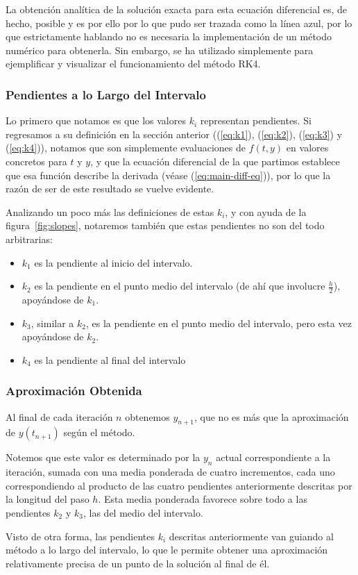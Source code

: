 La obtención analítica de la solución exacta para esta ecuación diferencial es, de hecho, posible y es por ello por lo que pudo ser trazada como la línea azul, por lo que estrictamente hablando no es necesaria la implementación de un método numérico para obtenerla. Sin embargo, se ha utilizado simplemente para ejemplificar y visualizar el funcionamiento del método RK4.

\subsubsection{Pendientes a lo Largo del Intervalo}

Lo primero que notamos es que los valores \(k_{i}\) representan pendientes. Si regresamos a su definición en la sección anterior ((\ref{eq:k1}), (\ref{eq:k2}), (\ref{eq:k3}) y (\ref{eq:k4})), notamos que son simplemente evaluaciones de \(f(t,y)\) en valores concretos para \(t\) y \(y\), y que la ecuación diferencial de la que partimos establece que esa función describe la derivada (véase (\ref{eq:main-diff-eq})), por lo que la razón de ser de este resultado se vuelve evidente.

Analizando un poco más las definiciones de estas \(k_{i}\), y con ayuda de la figura~\ref{fig:slopes}, notaremos también que estas pendientes no son del todo arbitrarias:
\begin{itemize}
	\item \(k_{1}\) es la pendiente al inicio del intervalo.
	\item \(k_{2}\) es la pendiente en el punto medio del intervalo (de ahí que involucre \(\frac{h}{2}\)), apoyándose de \(k_{1}\).
	\item \(k_{3}\), similar a \(k_{2}\), es la pendiente en el punto medio del intervalo, pero esta vez apoyándose de \(k_{2}\).
	\item \(k_{4}\) es la pendiente al final del intervalo
\end{itemize}

\subsubsection{Aproximación Obtenida}

Al final de cada iteración \(n\) obtenemos \(y_{n+1}\), que no es más que la aproximación de \(y(t_{n+1})\) según el método.

Notemos que este valor es determinado por la \(y_{n}\) actual correspondiente a la iteración, sumada con una media ponderada de cuatro incrementos, cada uno correspondiendo al producto de las cuatro pendientes anteriormente descritas por la longitud del paso \(h\). Esta media ponderada favorece sobre todo a las pendientes \(k_{2}\) y \(k_{3}\), las del medio del intervalo.

Visto de otra forma, las pendientes \(k_{i}\) descritas anteriormente van guiando al método a lo largo del intervalo, lo que le permite obtener una aproximación relativamente precisa de un punto de la solución al final de él.
